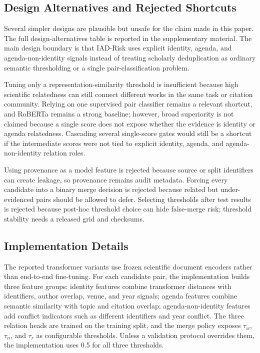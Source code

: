 \documentclass[preprint,12pt]{elsarticle}
\begin{document}
\subsection{Design Alternatives and Rejected Shortcuts}

Several simpler designs are plausible but unsafe for the claim made in this paper. The full design-alternatives table is reported in the supplementary material. The main design boundary is that IAD-Risk uses explicit identity, agenda, and agenda-non-identity signals instead of treating scholarly deduplication as ordinary semantic thresholding or a single pair-classification problem.

Tuning only a representation-similarity threshold is insufficient because high scientific relatedness can still connect different works in the same task or citation community. Relying on one supervised pair classifier remains a relevant shortcut, and RoBERTa remains a strong baseline; however, broad superiority is not claimed because a single score does not expose whether the evidence is identity or agenda relatedness. Cascading several single-score gates would still be a shortcut if the intermediate scores were not tied to explicit identity, agenda, and agenda-non-identity relation roles.

Using provenance as a model feature is rejected because source or split identifiers can create leakage, so provenance remains audit metadata. Forcing every candidate into a binary merge decision is rejected because related but under-evidenced pairs should be allowed to defer. Selecting thresholds after test results is rejected because post-hoc threshold choice can hide false-merge risk; threshold stability needs a released grid and checksums.

\subsection{Implementation Details}

The reported transformer variants use frozen scientific document encoders rather than end-to-end fine-tuning. For each candidate pair, the implementation builds three feature groups: identity features combine transformer distances with identifiers, author overlap, venue, and year signals; agenda features combine semantic similarity with topic and citation overlap; agenda-non-identity features add conflict indicators such as different identifiers and year conflict. The three relation heads are trained on the training split, and the merge policy exposes $\tau_w$, $\tau_n$, and $\tau_r$ as configurable thresholds. Unless a validation protocol overrides them, the implementation uses 0.5 for all three thresholds.
\end{document}
